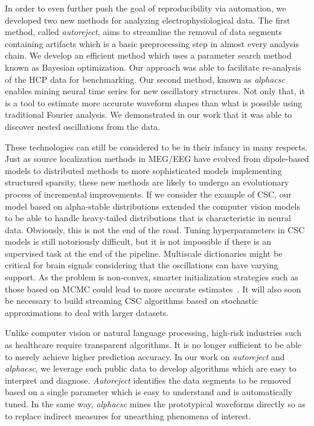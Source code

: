 In order to even further push the goal of reproducibility via automation, we developed two new methods for analyzing electrophysiological data. The first method, called \emph{autoreject}, aims to streamline the removal of data segments containing artifacts which is a basic preprocessing step in almost every analysis chain. We develop an efficient method which uses a parameter search method known as Bayesian optimization. Our approach was able to facilitate re-analysis of the \ac{HCP} data for benchmarking. Our second method, known as \emph{alphacsc} enables mining neural time series for new oscillatory structures. Not only that, it is a tool to estimate more accurate waveform shapes than what is possible using traditional Fourier analysis. We demonstrated in our work that it was able to discover nested oscillations from the data.

These technologies can still be considered to be in their infancy in many respects. Just as source localization methods in \ac{MEG}/\ac{EEG} have evolved from dipole-based models to distributed methods to more sophisticated models implementing structured sparsity, these new methods are likely to undergo an evolutionary process of incremental improvements. If we consider the example of \ac{CSC}, our model based on alpha-stable distributions extended the computer vision models to be able to handle heavy-tailed distributions that is characteristic in neural data. Obviously, this is not the end of the road. Tuning hyperparameters in \ac{CSC} models is still notoriously difficult, but it is not impossible if there is an supervised task at the end of the pipeline. Multiscale dictionaries might be critical for brain signals considering that the oscillations can have varying support. As the problem is non-convex, smarter initialization strategies such as those based on \ac{MCMC} could lead to more accurate estimates~\citep{bachem2016fast}. It will also soon be necessary to build streaming \ac{CSC} algorithms based on stochastic approximations to deal with larger datasets.

Unlike computer vision or natural language processing, high-risk industries such as healthcare require transparent algorithms. It is no longer sufficient to be able to merely achieve higher prediction accuracy.
In our work on \emph{autoreject} and \emph{alphacsc}, we leverage such public data to develop algorithms which are easy to interpret and diagnose. \emph{Autoreject} identifies the data segments to be removed based on a single parameter which is easy to understand and is automatically tuned. In the same way, \emph{alphacsc} mines the prototypical waveforms directly so as to replace indirect measures for unearthing phenomena of interest.

